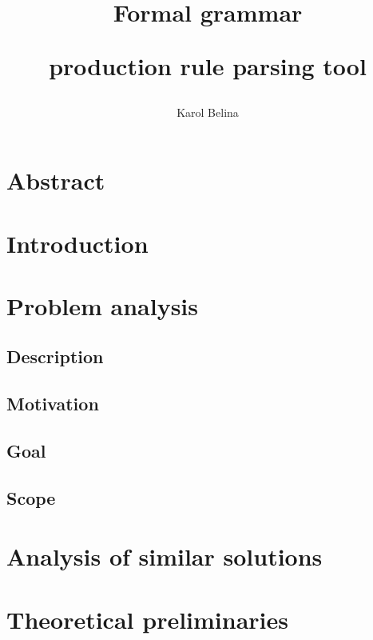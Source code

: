 \documentclass[english,engineering]{wizthesis}
\author{Karol Belina}
\title{Formal grammar\par production rule parsing tool}
\begin{document}
\frontmatter %

\maketitle

\chapter*{Abstract}

\tableofcontents

\mainmatter %

{\backmatter %
\chapter{Introduction}}

\chapter{Problem analysis}

\section{Description}

\section{Motivation}

\section{Goal}

\section{Scope}

\chapter{Analysis of similar solutions}

\chapter{Theoretical preliminaries}
\end{document}
